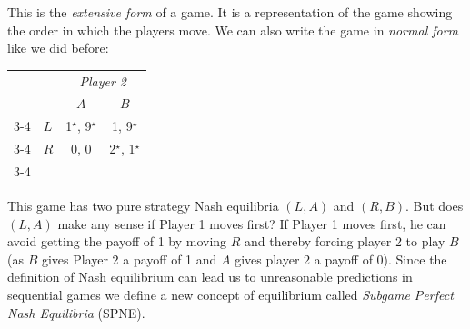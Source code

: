 \documentclass{article}
\begin{document}
\begin{center}
\end{center}
This is the \emph{extensive form} of a game. It is a representation of the game showing the order in which the players move. We can also write the game in \emph{normal form} like we did before:
    \begin{center}
      \begin{tabular}{llcc}
        & & \multicolumn{2}{c}{\emph{Player 2}} \\
        & & $A$& $B$\\ \cline{3-4}
        \multirow{2}{*}{\emph{Player 1}} & $L$& \multicolumn{1}{|c|}{1$^\star$, 9$^\star$} & \multicolumn{1}{c|}{1, 9$^\star$} \\ \cline{3-4}
        & $R$ & \multicolumn{1}{|c|}{0, 0} & \multicolumn{1}{c|}{2$^\star$, 1$^\star$} \\ \cline{3-4}
      \end{tabular}
    \end{center}
    This game has two pure strategy Nash equilibria $\left( L,A \right)$ and $\left( R,B \right)$. But does $\left( L,A \right)$ make any sense if Player 1 moves first? If Player 1 moves first, he can avoid getting the payoff of 1 by moving $R$ and thereby forcing player 2 to play $B$ (as $B$ gives Player 2 a payoff of 1 and $A$ gives player 2 a payoff of 0). Since the definition of Nash equilibrium can lead us to unreasonable predictions in sequential games we define a new concept of equilibrium called \emph{Subgame Perfect Nash Equilibria} (SPNE).
\end{document}

